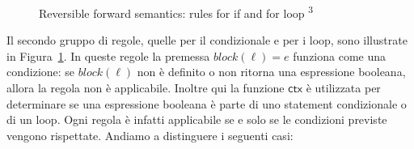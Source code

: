 \documentclass{article}
\theoremstyle{plain}
\theoremstyle{definition}
\theoremstyle{plain}
\def \config#1{\langle #1 \rangle}
\newcommand{\ms}[1]{\mathsf{#1}}
\newcommand \tuple[2]{ #1 \vdash #2}
\newcommand{\block}{\mathit{block}}
\newcommand{\s}{\pi}
\newcommand{\cons}{\!:\!}
\newcommand{\entry}{\mathit{entry}}
\newcommand{\context}{\mathsf{ctx}}
\newcommand{\rh}{\rightharpoonup}
\newcommand{\edge}{\longrightarrow}
\begin{document}
\begin{figure}[h]
\caption[Reversible forward semantics: rules for if and for loop]{Reversible forward semantics: rules for if and for loop \textsuperscript{3}} \label{fig:reversible-ifloop}
\end{figure}
%
Il secondo gruppo di regole, quelle per il condizionale e per i loop, sono illustrate in Figura~\ref{fig:reversible-ifloop}. In queste regole la premessa $\block(\ell) = e$ funziona come una condizione: se $\block(\ell)$ non è definito o non ritorna una espressione booleana, allora la regola non è applicabile. Inoltre qui la funzione $\context$ è utilizzata per determinare se una espressione booleana è parte di uno statement condizionale o di un loop. Ogni regola è infatti applicabile se e solo se le condizioni previste vengono rispettate. Andiamo a distinguere i seguenti casi:
\end{document}
